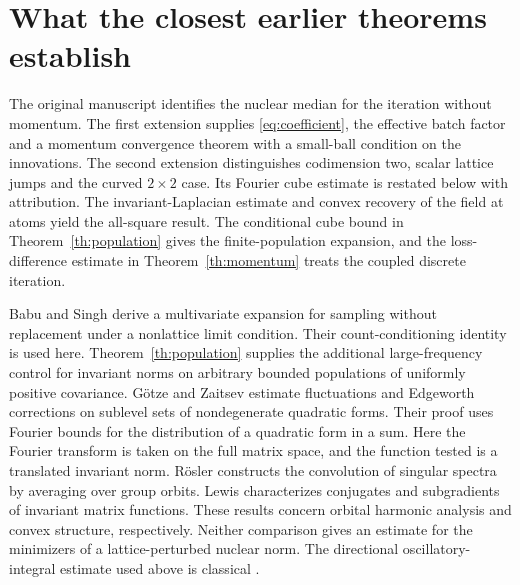 \documentclass[10pt,letterpaper]{article}
\begin{document}
\section{What the closest earlier theorems establish}

The original manuscript \cite[Theorem 2]{saga} identifies the nuclear median for the iteration without momentum. The first extension \cite[Theorems 4, 15 and 16]{pb} supplies \eqref{eq:coefficient}, the effective batch factor and a momentum convergence theorem with a small-ball condition on the innovations. The second extension \cite[Theorems 8, 12 and 16]{db} distinguishes codimension two, scalar lattice jumps and the curved $2\times2$ case. Its Fourier cube estimate is restated below with attribution. The invariant-Laplacian estimate and convex recovery of the field at atoms yield the all-square result. The conditional cube bound in Theorem~\ref{th:population} gives the finite-population expansion, and the loss-difference estimate in Theorem~\ref{th:momentum} treats the coupled discrete iteration.

Babu and Singh \cite[Theorem 1]{bs} derive a multivariate expansion for sampling without replacement under a nonlattice limit condition. Their count-conditioning identity is used here. Theorem~\ref{th:population} supplies the additional large-frequency control for invariant norms on arbitrary bounded populations of uniformly positive covariance. G\"otze and Zaitsev \cite[Theorems 1.1 and 2.2]{gz} estimate fluctuations and Edgeworth corrections on sublevel sets of nondegenerate quadratic forms. Their proof uses Fourier bounds for the distribution of a quadratic form in a sum. Here the Fourier transform is taken on the full matrix space, and the function tested is a translated invariant norm. R\"osler \cite[Theorem 4.1]{rosler} constructs the convolution of singular spectra by averaging over group orbits. Lewis \cite[Theorem 2.4 and Corollary 2.5]{lewis} characterizes conjugates and subgradients of invariant matrix functions. These results concern orbital harmonic analysis and convex structure, respectively. Neither comparison gives an estimate for the minimizers of a lattice-perturbed nuclear norm. The directional oscillatory-integral estimate used above is classical \cite{ccw}.
\end{document}
